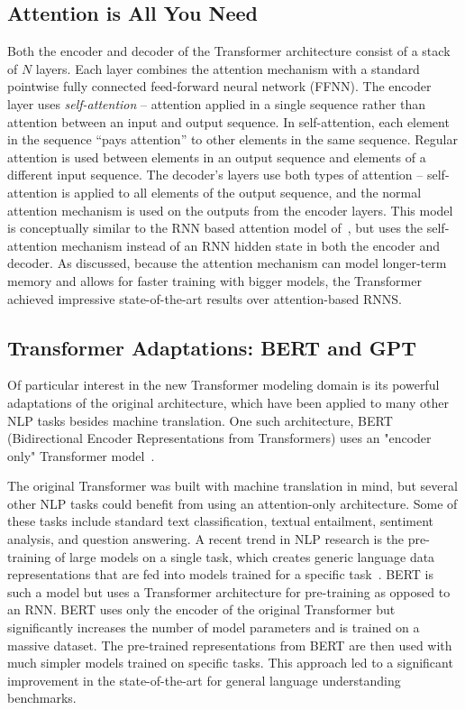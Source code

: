 \subsection{Attention is All You Need}
Both the encoder and decoder of the Transformer architecture consist of a stack of $N$ layers. Each layer combines the attention mechanism with a standard pointwise fully connected feed-forward neural network (FFNN). The encoder layer uses \emph{self-attention} -- attention applied in a single sequence rather than attention between an input and output sequence. In self-attention, each element in the sequence ``pays attention'' to other elements in the same sequence. Regular attention is used between elements in an output sequence and elements of a different input sequence. The decoder's layers use both types of attention -- self-attention is applied to all elements of the output sequence, and the normal attention mechanism is used on the outputs from the encoder layers. This model is conceptually similar to the RNN based attention model of~\citet{bahdanau2014neural}, but uses the self-attention mechanism instead of an RNN hidden state in both the encoder and decoder. As discussed, because the attention mechanism can model longer-term memory and allows for faster training with bigger models, the Transformer achieved impressive state-of-the-art results over attention-based RNNS. 

\subsection{Transformer Adaptations: BERT and GPT}
Of particular interest in the new Transformer modeling domain is its powerful adaptations of the original architecture, which have been applied to many other NLP tasks besides machine translation. One such architecture, BERT (Bidirectional Encoder Representations from Transformers) uses an "encoder only" Transformer model~\cite{devlin2018bert}. 

The original Transformer was built with machine translation in mind, but several other NLP tasks could benefit from using an attention-only architecture. Some of these tasks include standard text classification, textual entailment, sentiment analysis, and question answering. A recent trend in NLP research is the pre-training of large models on a single task, which creates generic language data representations that are fed into models trained for a specific task~\cite{peters2018deep}. BERT is such a model but uses a Transformer architecture for pre-training as opposed to an RNN. BERT uses only the encoder of the original Transformer but significantly increases the number of model parameters and is trained on a massive dataset. The pre-trained representations from BERT are then used with much simpler models trained on specific tasks. This approach led to a significant improvement in the state-of-the-art for general language understanding benchmarks.  

